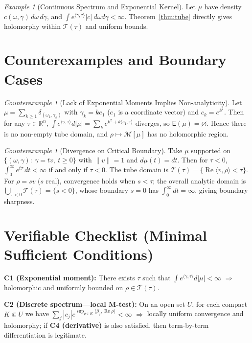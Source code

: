 \documentclass[11pt,a4paper]{article}
\theoremstyle{remark}
\newtheorem{example}[theorem]{Example}
\newtheorem{counterexample}[theorem]{Counterexample}
\DeclareMathOperator{\Re}{Re}
\begin{document}
\begin{example}[Continuous Spectrum and Exponential Kernel]\label{ex:continuous}
Let $\mu$ have density $c(\omega,\gamma)\,d\omega\,d\gamma$, and $\int e^{\langle\gamma,\tau\rangle}|c|\ d\omega d\gamma<\infty$. Theorem~\ref{thm:tube} directly gives holomorphy within $\mathcal{T}(\tau)$ and uniform bounds.
\end{example}

\section{Counterexamples and Boundary Cases}

\begin{counterexample}[Lack of Exponential Moments Implies Non-analyticity]\label{cex:moment}
Let $\mu=\sum_{k\ge1}\delta_{(\omega_k,\gamma_k)}$ with $\gamma_k=k e_1$ ($e_1$ is a coordinate vector) and $c_k=e^{k^2}$. Then for any $\tau\in\mathbb{R}^n$,
$\int e^{\langle\gamma,\tau\rangle}d|\mu|=\sum_k e^{k^2 + k\langle e_1,\tau\rangle}$ diverges, so $\mathsf{E}(\mu)=\varnothing$. Hence there is no non-empty tube domain, and $\rho\mapsto\mathcal{M}[\mu]$ has no holomorphic region.
\end{counterexample}

\begin{counterexample}[Divergence on Critical Boundary]\label{cex:boundary}
Take $\mu$ supported on $\{(\omega,\gamma):\ \gamma = t v,\ t\ge 0\}$ with $\|v\|=1$ and $d\mu(t)=dt$. Then for $\tau<0$, $\int_0^\infty e^{t \tau}\,dt<\infty$ if and only if $\tau<0$. The tube domain is $\mathcal{T}(\tau)=\{\Re \langle v,\rho\rangle <\tau\}$. For $\rho=s v$ ($s$ real), convergence holds when $s<\tau$; the overall analytic domain is $\bigcup_{\tau<0} \mathcal{T}(\tau)=\{s<0\}$, whose boundary $s=0$ has $\int_0^\infty dt=\infty$, giving boundary sharpness.
\end{counterexample}

\section{Verifiable Checklist (Minimal Sufficient Conditions)}

\textbf{C1 (Exponential moment):} There exists $\tau$ such that $\int e^{\langle\gamma,\tau\rangle}d|\mu|<\infty$ $\Rightarrow$ holomorphic and uniformly bounded on $\rho\in\mathcal{T}(\tau)$.

\textbf{C2 (Discrete spectrum---local M-test):} On an open set $U$, for each compact $K\Subset U$ we have $\sum_j|c_j|e^{\sup_{\rho\in K}\langle\beta_j,\Re\rho\rangle}<\infty$ $\Rightarrow$ locally uniform convergence and holomorphy; if \textbf{C4 (derivative)} is also satisfied, then term-by-term differentiation is legitimate.
\end{document}
